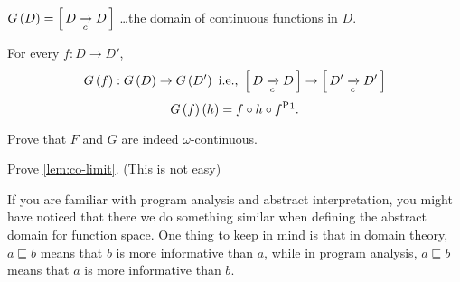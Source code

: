 \begin{enumcirc}
\begin{enumrm}
		$G\left( D \right) = \left[ \, D \xrightarrow[c]{} D \, \right]$ \dots the domain of continuous functions in $D$.

		For every $f: D \to D'$,
		\[
			G\left( f \right): G\left( D \right) \to G\left( D' \right) \textrm{ i.e., } \left[ \, D \xrightarrow[c]{} D \, \right] \to \left[ \, D' \xrightarrow[c]{} D' \, \right]
		\]
		\[
			G\prths{f}\prths{h} = f \circ h \circ f^\textrm{P}\footnotemark.
		\]
	\end{enumrm}
	\begin{exercise}
		Prove that $F$ and $G$ are indeed $\omega$-continuous.
	\end{exercise}
	\begin{exercise}
		Prove \cref{lem:co-limit}.
		(This is not easy)
	\end{exercise}
	If you are familiar with program analysis and abstract interpretation, you
	might have noticed that there we do something similar when defining the
	abstract domain for function space.
	One thing to keep in mind is that in domain theory, $a \sqsubseteq b$ means
	that $b$ is more informative than $a$, while in program analysis, $a
		\sqsubseteq b$ means that $a$ is more informative than $b$.
\end{enumcirc}
